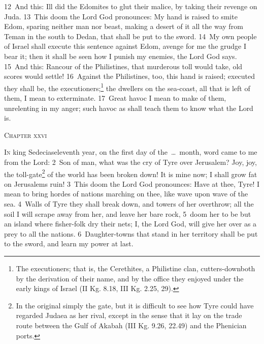 \documentclass[10pt]{book} %
\begin{document}
\textcolor{benred8}{12}~And this: Ill did the Edomites to glut their malice, by taking their revenge on Juda. \textcolor{benred8}{13}~This doom the Lord God pronounces: My hand is raised to smite Edom, sparing neither man nor beast, making a desert of it all the way from Teman in the south to Dedan, that shall be put to the sword. \textcolor{benred8}{14}~My own people of Israel shall execute this sentence against Edom, avenge for me the grudge I bear it; then it shall be seen how I punish my enemies, the Lord God says.
\textcolor{benred8}{15}~And this: Rancour of the Philistines, that murderous toll would take, old scores would settle! \textcolor{benred8}{16}~Against the Philistines, too, this hand is raised; executed they shall be, the executioners;\footnote[2]{\textasciigrave The executioners\textquotesingle ; that is, the Cerethites, a Philistine clan, \textasciigrave cutters-down\textquotesingle  both by the derivation of their name, and by the office they enjoyed under the early kings of Israel (II Kg. 8.18, III Kg. 2.25, 29).} the dwellers on the sea-coast, all that is left of them, I mean to exterminate. \textcolor{benred8}{17}~Great havoc I mean to make of them, unrelenting in my anger; such havoc as shall teach them to know what the Lord is.
\begin{large}\begin{center}\textsc{Chapter xxvi}\end{center}\end{large}
\lettrine[lines=2]{I}{n} king Sedecias\textquotesingle  eleventh year, on the first day of the~\ldots\  month, word came to me from the Lord: \textcolor{benred8}{2}~Son of man, what was the cry of Tyre over Jerusalem? Joy, joy, the toll-gate\footnote[1]{In the original simply \textasciigrave the gate\textquotesingle , but it is difficult to see how Tyre could have regarded Judaea as her rival, except in the sense that it lay on the trade route between the Gulf of Akabah (III Kg. 9.26, 22.49) and the Phenician ports.} of the world has been broken down! It is mine now; I shall grow fat on Jerusalem\textquotesingle s ruin! \textcolor{benred8}{3}~This doom the Lord God pronounces: Have at thee, Tyre! I mean to bring hordes of nations marching on thee, like wave upon wave of the sea. \textcolor{benred8}{4}~Walls of Tyre they shall break down, and towers of her overthrow; all the soil I will scrape away from her, and leave her bare rock, \textcolor{benred8}{5}~doom her to be but an island where fisher-folk dry their nets; I, the Lord God, will give her over as a prey to all the nations. \textcolor{benred8}{6}~Daughter-towns that stand in her territory shall be put to the sword, and learn my power at last.
\end{document}
